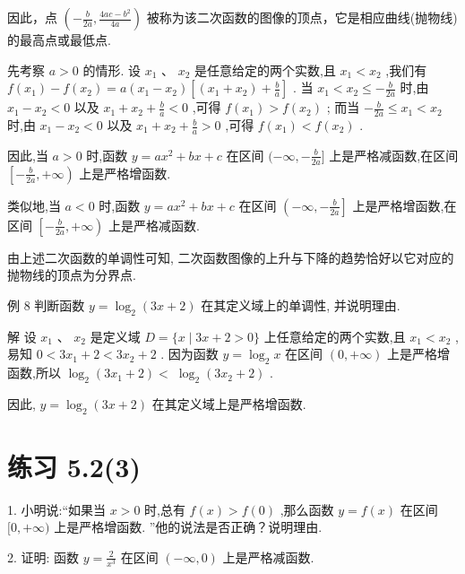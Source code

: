 \documentclass[10pt]{article}
\begin{document}
因此，点 \(\left( {-\frac{b}{2a},\frac{{4ac} - {b}^{2}}{4a}}\right)\) 被称为该二次函数的图像的顶点，它是相应曲线(抛物线)的最高点或最低点.

先考察 \(a > 0\) 的情形. 设 \({x}_{1}\text{ 、 }{x}_{2}\) 是任意给定的两个实数,且 \({x}_{1} < {x}_{2}\) ,我们有 \(f\left( {x}_{1}\right)  - f\left( {x}_{2}\right)  = a\left( {{x}_{1} - {x}_{2}}\right) \left\lbrack  {\left( {{x}_{1} + {x}_{2}}\right)  + \frac{b}{a}}\right\rbrack\) . 当 \({x}_{1} < {x}_{2} \leq   - \frac{b}{2a}\) 时,由 \({x}_{1} - {x}_{2} < 0\) 以及 \({x}_{1} + {x}_{2} + \frac{b}{a} < 0\) ,可得 \(f\left( {x}_{1}\right)  > f\left( {x}_{2}\right)\) ; 而当 \(- \frac{b}{2a} \leq  {x}_{1} < {x}_{2}\) 时,由 \({x}_{1} - {x}_{2} < 0\) 以及 \({x}_{1} + {x}_{2} + \frac{b}{a} > 0\) ,可得 \(f\left( {x}_{1}\right)  < f\left( {x}_{2}\right)\) .

因此,当 \(a > 0\) 时,函数 \(y = a{x}^{2} + {bx} + c\) 在区间 \(( - \infty , - \frac{b}{2a}\rbrack\) 上是严格减函数,在区间 \(\left\lbrack  {-\frac{b}{2a}, + \infty }\right)\) 上是严格增函数.

类似地,当 \(a < 0\) 时,函数 \(y = a{x}^{2} + {bx} + c\) 在区间 \(\left( {-\infty , - \frac{b}{2a}}\right\rbrack\) 上是严格增函数,在区间 \(\left\lbrack  {-\frac{b}{2a}, + \infty }\right)\) 上是严格减函数.

由上述二次函数的单调性可知, 二次函数图像的上升与下降的趋势恰好以它对应的抛物线的顶点为分界点.

例 8 判断函数 \(y = {\log }_{2}\left( {{3x} + 2}\right)\) 在其定义域上的单调性, 并说明理由.

解 设 \({x}_{1}\text{ 、 }{x}_{2}\) 是定义域 \(D = \{ x \mid  {3x} + 2 > 0\}\) 上任意给定的两个实数,且 \({x}_{1} < {x}_{2}\) ,易知 \(0 < 3{x}_{1} + 2 < 3{x}_{2} + 2\) . 因为函数 \(y = {\log }_{2}x\) 在区间 \(\left( {0, + \infty }\right)\) 上是严格增函数,所以 \({\log }_{2}\left( {3{x}_{1} + 2}\right)  < \; {\log }_{2}\left( {3{x}_{2} + 2}\right)\) .

因此, \(y = {\log }_{2}\left( {{3x} + 2}\right)\) 在其定义域上是严格增函数.

\section*{练习 5.2(3)}

1. 小明说:“如果当 \(x > 0\) 时,总有 \(f\left( x\right)  > f\left( 0\right)\) ,那么函数 \(y = f\left( x\right)\) 在区间 \(\lbrack 0, + \infty )\) 上是严格增函数. ”他的说法是否正确？说明理由.

2. 证明: 函数 \(y = \frac{2}{{x}^{3}}\) 在区间 \(\left( {-\infty ,0}\right)\) 上是严格减函数.
\end{document}
